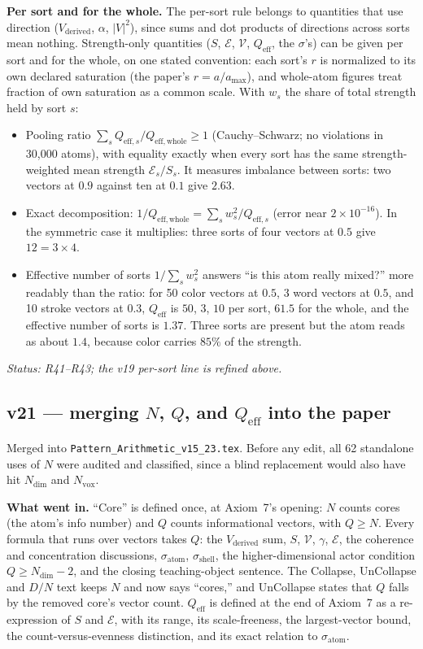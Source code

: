 \documentclass[11pt]{article}
\begin{document}
\textbf{Per sort and for the whole.} The per-sort rule belongs to
quantities that use direction ($V_{\text{derived}}$, $\alpha$,
$|V|^2$), since sums and dot products of directions across sorts mean
nothing. Strength-only quantities ($S$, $\mathcal E$, $\mathcal V$,
$Q_{\mathrm{eff}}$, the $\sigma$'s) can be given per sort and for the
whole, on one stated convention: each sort's $r$ is normalized to its
own declared saturation (the paper's $r=a/a_{\max}$), and whole-atom
figures treat fraction of own saturation as a common scale. With
$w_s$ the share of total strength held by sort $s$:
\begin{itemize}
\item Pooling ratio $\sum_sQ_{\mathrm{eff},s}/Q_{\mathrm{eff,whole}}\ge1$
(Cauchy--Schwarz; no violations in 30{,}000 atoms), with equality
exactly when every sort has the same strength-weighted mean strength
$\mathcal E_s/S_s$. It measures imbalance between sorts: two vectors at
$0.9$ against ten at $0.1$ give $2.63$.
\item Exact decomposition:
$1/Q_{\mathrm{eff,whole}}=\sum_sw_s^2/Q_{\mathrm{eff},s}$ (error near
$2\times10^{-16}$). In the symmetric case it multiplies: three sorts of
four vectors at $0.5$ give $12=3\times4$.
\item Effective number of sorts $1/\sum_sw_s^2$ answers ``is this atom
really mixed?'' more readably than the ratio: for 50 color vectors at
$0.5$, 3 word vectors at $0.5$, and 10 stroke vectors at $0.3$,
$Q_{\mathrm{eff}}$ is $50$, $3$, $10$ per sort, $61.5$ for the whole,
and the effective number of sorts is $1.37$. Three sorts are present but
the atom reads as about $1.4$, because color carries $85\%$ of the
strength.
\end{itemize}
\emph{Status: R41--R43; the v19 per-sort line is refined above.}


\subsection*{v21 --- merging $N$, $Q$, and $Q_{\mathrm{eff}}$ into the paper}
Merged into \texttt{Pattern\_Arithmetic\_v15\_23.tex}. Before any edit,
all 62 standalone uses of $N$ were audited and classified, since a
blind replacement would also have hit $N_{\mathrm{dim}}$ and
$N_{\mathrm{vox}}$.

\textbf{What went in.} ``Core'' is defined once, at Axiom~7's opening:
$N$ counts cores (the atom's info number) and $Q$ counts informational
vectors, with $Q\ge N$. Every formula that runs over vectors takes $Q$:
the $V_{\text{derived}}$ sum, $S$, $\mathcal V$, $\gamma$, $\mathcal E$,
the coherence and concentration discussions, $\sigma_{\text{atom}}$,
$\sigma_{\text{shell}}$, the higher-dimensional actor condition
$Q\ge N_{\mathrm{dim}}-2$, and the closing teaching-object sentence. The
Collapse, UnCollapse and $D/N$ text keeps $N$ and now says ``cores,''
and UnCollapse states that $Q$ falls by the removed core's vector
count. $Q_{\mathrm{eff}}$ is defined at the end of Axiom~7 as a
re-expression of $S$ and $\mathcal E$, with its range, its
scale-freeness, the largest-vector bound, the count-versus-evenness
distinction, and its exact relation to $\sigma_{\text{atom}}$.
\end{document}
